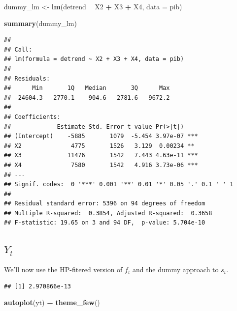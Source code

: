 \documentclass[
]{article}
\newenvironment{Shaded}{\begin{snugshade}}{\end{snugshade}}
\newcommand{\DataTypeTok}[1]{\textcolor[rgb]{0.13,0.29,0.53}{#1}}
\newcommand{\KeywordTok}[1]{\textcolor[rgb]{0.13,0.29,0.53}{\textbf{#1}}}
\newcommand{\NormalTok}[1]{#1}
\newcommand{\OperatorTok}[1]{\textcolor[rgb]{0.81,0.36,0.00}{\textbf{#1}}}
\newcommand{\StringTok}[1]{\textcolor[rgb]{0.31,0.60,0.02}{#1}}
\begin{document}
\begin{Shaded}
\begin{Highlighting}[]
\NormalTok{dummy_lm <-}\StringTok{ }\KeywordTok{lm}\NormalTok{(detrend }\OperatorTok{~}\StringTok{ }\NormalTok{X2 }\OperatorTok{+}\StringTok{ }\NormalTok{X3 }\OperatorTok{+}\StringTok{ }\NormalTok{X4, }\DataTypeTok{data =}\NormalTok{ pib)}

\KeywordTok{summary}\NormalTok{(dummy_lm)}
\end{Highlighting}
\end{Shaded}

\begin{verbatim}
## 
## Call:
## lm(formula = detrend ~ X2 + X3 + X4, data = pib)
## 
## Residuals:
##      Min       1Q   Median       3Q      Max 
## -24604.3  -2770.1    904.6   2781.6   9672.2 
## 
## Coefficients:
##             Estimate Std. Error t value Pr(>|t|)    
## (Intercept)    -5885       1079  -5.454 3.97e-07 ***
## X2              4775       1526   3.129  0.00234 ** 
## X3             11476       1542   7.443 4.63e-11 ***
## X4              7580       1542   4.916 3.73e-06 ***
## ---
## Signif. codes:  0 '***' 0.001 '**' 0.01 '*' 0.05 '.' 0.1 ' ' 1
## 
## Residual standard error: 5396 on 94 degrees of freedom
## Multiple R-squared:  0.3854, Adjusted R-squared:  0.3658 
## F-statistic: 19.65 on 3 and 94 DF,  p-value: 5.704e-10
\end{verbatim}

\subsection{$Y_t$}

We'll now use the HP-fitered version of \(f_t\) and the dummy approach
to \(s_t\).

\begin{Shaded}
\end{Shaded}

\begin{verbatim}
## [1] 2.970866e-13
\end{verbatim}

\begin{Shaded}
\begin{Highlighting}[]
\KeywordTok{autoplot}\NormalTok{(yt) }\OperatorTok{+}\StringTok{ }\KeywordTok{theme_few}\NormalTok{()}
\end{Highlighting}
\end{Shaded}
\end{document}

